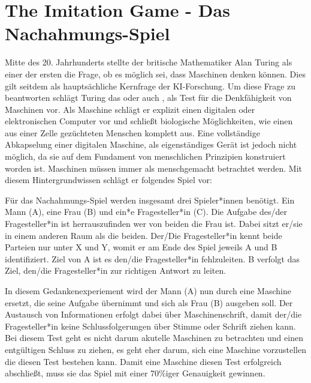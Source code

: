 \documentclass[12pt,german,ngerman]{report}
\begin{document}
    \section{The Imitation Game - Das Nachahmungs-Spiel}
        Mitte des 20. Jahrhunderts stellte der britische Mathematiker Alan Turing als einer der ersten
        die Frage, ob es möglich sei, dass Maschinen denken können. Dies gilt seitdem als hauptsächliche
        Kernfrage der KI-Forschung. Um diese Frage zu beantworten schlägt Turing das  oder
        auch , als Test für die Denkfähigkeit von Maschinen vor. Als Maschine schlägt er
        explizit einen digitalen oder elektronischen Computer vor und schließt biologische Möglichkeiten,
        wie einen aus einer Zelle gezüchteten Menschen komplett aus.\cite[435]{turing1950computing}
        Eine vollständige Abkapselung einer digitalen Maschine, als eigenständiges Gerät ist jedoch nicht möglich, da sie auf dem
        Fundament von menschlichen Prinzipien konstruiert worden ist. Maschinen müssen immer als menschgemacht betrachtet werden.
        Mit diesem Hintergrundwissen schlägt er folgendes Spiel vor:
        \begin{displayquote}
            Für das Nachahmungs-Spiel werden insgesamt drei Spieler*innen benötigt. Ein Mann (A), eine Frau (B) und ein*e
            Fragesteller*in (C). Die Aufgabe des/der Fragesteller*in ist herrauszufinden wer von beiden die Frau ist.
            Dabei sitzt er/sie in einem anderen Raum als die beiden. Der/Die Fragesteller*in kennt beide Parteien
            nur unter X und Y, womit er am Ende des Spiel jeweils A und B identifiziert. Ziel von A ist es den/die Fragesteller*in
            fehlzuleiten. B verfolgt das Ziel, den/die Fragesteller*in zur richtigen Antwort zu leiten.
            \cite[433]{turing1950computing}
        \end{displayquote}
        In diesem Gedankenexperiement wird der Mann (A) nun durch eine Maschine ersetzt, die seine Aufgabe übernimmt und
        sich als Frau (B) ausgeben soll. Der Austausch von Informationen erfolgt dabei über Maschinenschrift, damit
        der/die Fragesteller*in keine Schlussfolgerungen über Stimme oder Schrift ziehen kann.\cite[433]{turing1950computing}
        Bei diesem Test geht es nicht darum akutelle Maschinen zu betrachten und einen entgültigen Schluss zu ziehen, es geht
        eher darum, sich eine Maschine vorzustellen die diesen Test bestehen kann. Damit eine Maschine diesen Test erfolgreich abschließt,
        muss sie das Spiel mit einer 70\%iger Genauigkeit gewinnen.\cite[1]{oppy&dowe2020turingtest}
        
\end{document}
